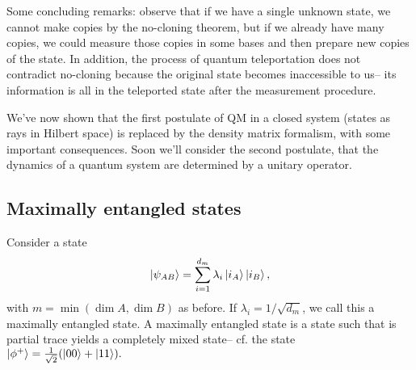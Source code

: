 Some concluding remarks: observe that if we have a single unknown state, we cannot make copies by the no-cloning theorem, but if we already have many copies, we could measure those copies in some bases and then prepare new copies of the state. In addition, the process of quantum teleportation does not contradict no-cloning because the original state becomes inaccessible to us-- its information is all in the teleported state after the measurement procedure.

We've now shown that the first postulate of QM in a closed system (states as rays in Hilbert space) is replaced by the density matrix formalism, with some important consequences. Soon we'll consider the second postulate, that the dynamics of a quantum system are determined by a unitary operator.

\subsection*{Maximally entangled states} Consider a state
\begin{equation}
    \left| \psi_{AB} \right>=\sum_{i=1}^{d_m} \lambda_i \left| i_A \right> \left| i_B \right>,
\end{equation}
with $m=\min(\dim A,\dim B)$ as before. If $\lambda_i=1/\sqrt{d_m}$, we call this a maximally entangled state. A maximally entangled state is a state such that is partial trace yields a completely mixed state-- cf. the state $\left| \phi^+ \right>=\frac{1}{\sqrt{2}}(\left| 00 \right>+\left| 11 \right>).$
